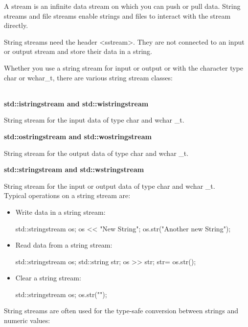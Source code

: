 A stream is an infinite data stream on which you can push or pull data. String streams and file streams enable strings and files to interact with the stream directly.


String streams need the header <sstream>. They are not connected to an input or output stream and store their data in a string.

Whether you use a string stream for input or output or with the character type char or wchar\_t, there are various string stream classes:

\noindent
\\\textbf{std::istringstream and std::wistringstream}

String stream for the input data of type char and wchar
_t.

\noindent
\textbf{std::ostringstream and std::wostringstream}

String stream for the output data of type char and wchar
_t.

\noindent
\textbf{std::stringstream and std::wstringstream}

String stream for the input or output data of type char and wchar
_t.\\

Typical operations on a string stream are:

\begin{itemize}
\item 
Write data in a string stream:

\begin{cpp}
std::stringstream os;
os << "New String";
os.str("Another new String");
\end{cpp}

\item 
Read data from a string stream:

\begin{cpp}
std::stringstream os;
std::string str;
os >> str;
str= os.str();
\end{cpp}

\item 
Clear a string stream:

\begin{cpp}
std::stringstream os;
os.str("");
\end{cpp}
\end{itemize}

String streams are often used for the type-safe conversion between strings and numeric values:

